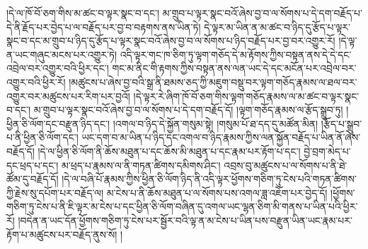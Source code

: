 །དེ་ལ་ཁོ་བོ་ཅག་གིས་མ་ཚང་བ་ལྟར་སྣང་བ་དང་། མ་གྲུབ་པ་ལྟར་སྣང་བའོ་ཞེས་བྱ་བ་ལ་སོགས་པ་དེ་དག་བརྗོད་པ་དེ་ནི་རྗོད་པར་བྱེད་པ་ལ་བརྗོད་པར་བྱ་བ་བརྟགས་ནས་ཡིན་ཏེ། དེ་ལྟར་མ་ཡིན་ན་མ་ཚང་བ་ཉིད་དུ་རྩོད་པ་ལྟར་སྣང་བ་དང་མ་གྲུབ་པ་ཉིད་དུ་རྩོད་པ་ལྟར་སྣང་བའོ་ཞེས་བྱ་བ་ལ་སོགས་པ་ཉིད་བརྗོད་པར་བྱ་བར་འགྱུར་རོ། །དེ་ལྟ་ན་ཡང་གཞུང་མངས་པར་འགྱུར་ཏེ། འདི་ལྟར་གང་ཁ་ཅིག་ཏུ་ལྟག་གཅོད་དེ་མ་རྟོགས་ཀྱིས་བསྟན་ནས་དེ་དེ་དང་འབྲེལ་བར་འགྱུར་བའི་ཕྱིར་དང་། གང་མ་ནིང་གི་རྟགས་ཀྱིས་བསྟན་ནས་ལན་ཡང་དེ་དང་མངོན་པར་འབྲེལ་བར་འགྱུར་བའི་ཕྱིར་རོ། །མཚུངས་པ་ཞེས་བྱ་བའི་སྒྲ་ནི་ཐམས་ཅད་ཀྱི་མཇུག་བསྡུ་བར་ལྟག་གཅོད་རྣམས་ལ་ཐལ་བར་འགྱུར་བར་མཚུངས་པར་རིག་པར་བྱའོ། །དེ་ལྟར་རེ་ཞིག་ཁོ་བོ་ཅག་གིས་ལྟག་གཅོད་རྣམས་ལ་མ་ཚང་བ་ལྟར་སྣང་བ་དང་། མ་གྲུབ་པ་ལྟར་སྣང་བའོ་ཞེས་བྱ་བ་ལ་སོགས་པ་དེ་དག་བརྗོད་དོ། །ལྟག་གཅོད་རྣམས་ལ་རྩོད་སྒྲུབ་ཏུ། །ཕྱིན་ཅི་ལོག་དང་བརྫུན་ཉིད་དང་། །འགལ་བ་ཉིད་དེ་སྐྱོན་གསུམ་སྟེ། །གསུམ་པོ་ཐ་དད་དུ་མཚོན་མིན། །རྩོད་པ་སྒྲུབ་པ་ནི་ཕྱིན་ཅི་ལོག་དང་། ཡང་དག་བ་མ་ཡིན་པ་ཉིད་དང་འགལ་བ་ཉིད་རྣམས་ཀྱིས་ལན་སྐྱོན་བརྗོད་པ་ཡིན་ནོ་ཞེས་བརྗོད་དོ། །དེ་ལ་ཕྱིན་ཅི་ལོག་ནི་ཆོས་མཐུན་པ་དང་ཆོས་མི་མཐུན་པ་དང་རྣམ་པར་རྟོག་པ་དང་། བྱེ་བྲག་མེད་པ་དང་ཕྲད་པ་དང་། མ་ཕྲད་པ་རྣམས་ལ་ནི་གཏན་ཚིགས་དམིགས་ཤིང་། འབྲས་བུ་མཚུངས་པ་ལ་སོགས་པ་ནི་ཐེ་ཚོམ་དུ་བརྗོད་དོ། །དེ་ལ་བཞི་པོ་རྣམས་ཀྱིས་ཕྱིན་ཅི་ལོག་ཉིད་ནི་འདི་ལྟར་ཕྱོགས་གཅིག་ཏུ་ངེས་པའི་གཏན་ཚིགས་ཀྱི་རྗེས་སུ་དཔོག་པར་བརྗོད་ལ། མ་ངེས་པ་ནི་ཆོས་མཐུན་པ་ལ་སོགས་པས་འགལ་ཟླ་འཇོག་པར་བྱེད་དོ། །ཕྱོགས་གཅིག་ཏུ་ངེས་པ་ནི་ཇི་ལྟར་མ་ངེས་པ་དང་ཕྱིན་ཅི་ལོག་བཞིན་དུ་འགལ་ཡང་ལྷན་ཅིག་མི་གནས་པ་ཡིན་པའི་ཕྱིར་རོ། །བདེན་ན་ཡང་དོན་ཕྱོགས་གཅིག་ཏུ་ངེས་པར་སྦྱོར་བའི་ལྟ་ན་མ་ངེས་པ་ཡིན་པས་བརྫུན་ཡིན་ཡང་རྣམ་པར་རྟོག་པ་མཚུངས་པར་བརྗོད་ནུས་སོ། །
